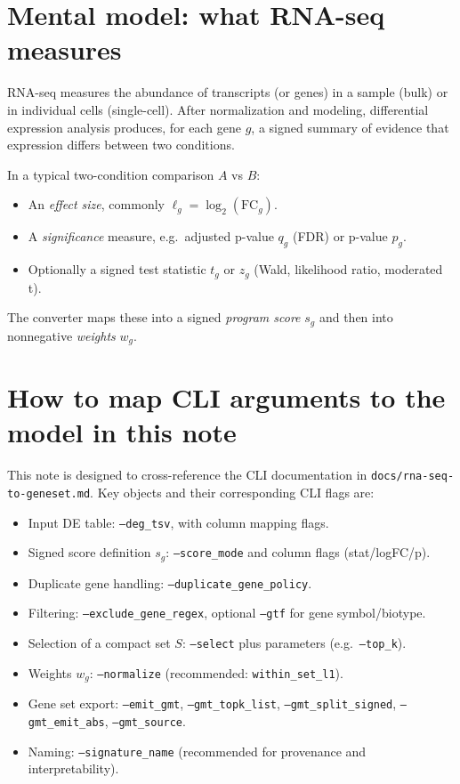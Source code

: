 \documentclass[11pt]{article}
\begin{document}
\section{Mental model: what RNA-seq measures}
RNA-seq measures the abundance of transcripts (or genes) in a sample (bulk) or in individual cells (single-cell).
After normalization and modeling, differential expression analysis produces, for each gene $g$, a signed summary of evidence that expression differs between two conditions.

In a typical two-condition comparison $A$ vs $B$:
\begin{itemize}[leftmargin=2em]
\item An \emph{effect size}, commonly $\ell_g = \log_2(\mathrm{FC}_g)$.
\item A \emph{significance} measure, e.g.\ adjusted p-value $q_g$ (FDR) or p-value $p_g$.
\item Optionally a signed test statistic $t_g$ or $z_g$ (Wald, likelihood ratio, moderated t).
\end{itemize}

The converter maps these into a signed \emph{program score} $s_g$ and then into nonnegative \emph{weights} $w_g$.

\section{How to map CLI arguments to the model in this note}
This note is designed to cross-reference the CLI documentation in \texttt{docs/rna-seq-to-geneset.md}.
Key objects and their corresponding CLI flags are:
\begin{itemize}[leftmargin=2em]
\item Input DE table: \texttt{--deg\_tsv}, with column mapping flags.
\item Signed score definition $s_g$: \texttt{--score\_mode} and column flags (stat/logFC/p).
\item Duplicate gene handling: \texttt{--duplicate\_gene\_policy}.
\item Filtering: \texttt{--exclude\_gene\_regex}, optional \texttt{--gtf} for gene symbol/biotype.
\item Selection of a compact set $S$: \texttt{--select} plus parameters (e.g.\ \texttt{--top\_k}).
\item Weights $w_g$: \texttt{--normalize} (recommended: \texttt{within\_set\_l1}).
\item Gene set export: \texttt{--emit\_gmt}, \texttt{--gmt\_topk\_list}, \texttt{--gmt\_split\_signed}, \texttt{--gmt\_emit\_abs}, \texttt{--gmt\_source}.
\item Naming: \texttt{--signature\_name} (recommended for provenance and interpretability).
\end{itemize}
\end{document}
